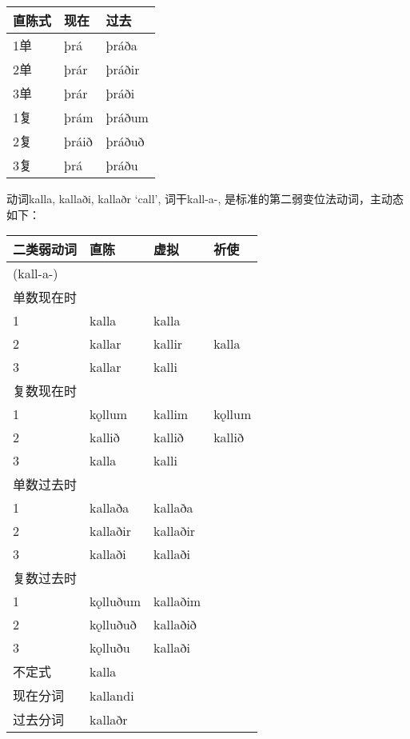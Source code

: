 \begin{longtable}{lll}
    \toprule
    直陈式 & 现在  & 过去   \\
    \midrule
    \endhead
    \bottomrule
    \endfoot
    1单    & þrá   & þráða  \\
    2单    & þrár  & þráðir \\
    3单    & þrár  & þráði  \\
    1复    & þrám  & þráðum \\
    2复    & þráið & þráðuð \\
    3复    & þrá   & þráðu  \\
\end{longtable}

动词kalla, kallaði, kallaðr `call‌', 词干kall-a-,
是标准的第二弱变位法动词，主动态如下：

\begin{longtable}{llll}
    \toprule
    二类弱动词 & 直陈     & 虚拟     & 祈使   \\
    \midrule
    \endhead
    \bottomrule
    \endfoot
    (kall-a-)  &          &          &        \\
    单数现在时 &          &          &        \\
    1          & kalla    & kalla    &        \\
    2          & kallar   & kallir   & kalla  \\
    3          & kallar   & kalli    &        \\
    复数现在时 &          &          &        \\
    1          & kǫllum   & kallim   & kǫllum \\
    2          & kallið   & kallið   & kallið \\
    3          & kalla    & kalli    &        \\
    单数过去时 &          &          &        \\
    1          & kallaða  & kallaða  &        \\
    2          & kallaðir & kallaðir &        \\
    3          & kallaði  & kallaði  &        \\
    复数过去时 &          &          &        \\
    1          & kǫlluðum & kallaðim &        \\
    2          & kǫlluðuð & kallaðið &        \\
    3          & kǫlluðu  & kallaði  &        \\
    不定式     & kalla    &          &        \\
    现在分词   & kallandi &          &        \\
    过去分词   & kallaðr  &          &        \\
\end{longtable}

